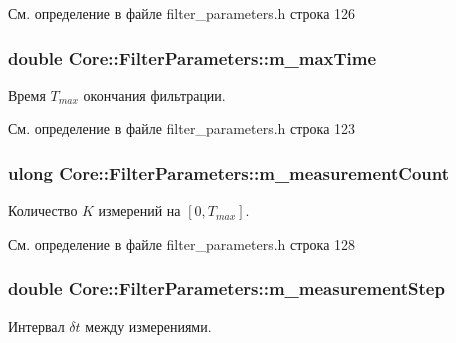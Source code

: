 См. определение в файле filter\+\_\+parameters.\+h строка 126

\subsubsection[{\texorpdfstring{m\+\_\+max\+Time}{m_maxTime}}]{\setlength{\rightskip}{0pt plus 5cm}double Core\+::\+Filter\+Parameters\+::m\+\_\+max\+Time\hspace{0.3cm}{\ttfamily [private]}}\hypertarget{class_core_1_1_filter_parameters_a5f906190ee024f4df75f8279e9986f2c}{}\label{class_core_1_1_filter_parameters_a5f906190ee024f4df75f8279e9986f2c}
Время $T_{max}$ окончания фильтрации. 

См. определение в файле filter\+\_\+parameters.\+h строка 123

\subsubsection[{\texorpdfstring{m\+\_\+measurement\+Count}{m_measurementCount}}]{\setlength{\rightskip}{0pt plus 5cm}ulong Core\+::\+Filter\+Parameters\+::m\+\_\+measurement\+Count\hspace{0.3cm}{\ttfamily [private]}}\hypertarget{class_core_1_1_filter_parameters_a931e9e09796c055d6c28d7c93d3121d9}{}\label{class_core_1_1_filter_parameters_a931e9e09796c055d6c28d7c93d3121d9}
Количество $K$ измерений на $[0, T_{max}]$. 

См. определение в файле filter\+\_\+parameters.\+h строка 128

\subsubsection[{\texorpdfstring{m\+\_\+measurement\+Step}{m_measurementStep}}]{\setlength{\rightskip}{0pt plus 5cm}double Core\+::\+Filter\+Parameters\+::m\+\_\+measurement\+Step\hspace{0.3cm}{\ttfamily [private]}}\hypertarget{class_core_1_1_filter_parameters_a68b0fe638b3a00a16cfa07f7d6a229fb}{}\label{class_core_1_1_filter_parameters_a68b0fe638b3a00a16cfa07f7d6a229fb}
Интервал $\delta t$ между измерениями. 

